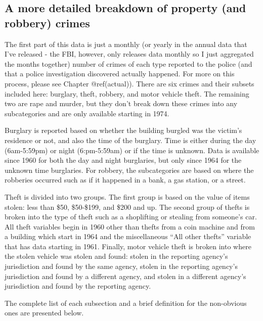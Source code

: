 \documentclass[
  12pt,
  openany]{book}
\begin{document}
\hypertarget{propertycount}{%
\subsection{A more detailed breakdown of property (and robbery) crimes}\label{propertycount}}

The first part of this data is just a monthly (or yearly in the annual data that I've released - the FBI, however, only releases data monthly so I just aggregated the months together) number of crimes of each type reported to the police (and that a police investigation discovered actually happened. For more on this process, please see Chapter @ref(actual)). There are six crimes and their subsets included here: burglary, theft, robbery, and motor vehicle theft. The remaining two are rape and murder, but they don't break down these crimes into any subcategories and are only available starting in 1974.

Burglary is reported based on whether the building burgled was the victim's residence or not, and also the time of the burglary. Time is either during the day (6am-5:59pm) or night (6:pm-5:59am) or if the time is unknown. Data is available since 1960 for both the day and night burglaries, but only since 1964 for the unknown time burglaries. For robbery, the subcategories are based on where the robberies occurred such as if it happened in a bank, a gas station, or a street.

Theft is divided into two groups. The first group is based on the value of items stolen: less than \$50, \$50-\$199, and \$200 and up. The second group of thefts is broken into the type of theft such as a shoplifting or stealing from someone's car. All theft variables begin in 1960 other than thefts from a coin machine and from a building which start in 1964 and the miscellaneous ``All other thefts'' variable that has data starting in 1961. Finally, motor vehicle theft is broken into where the stolen vehicle was stolen and found: stolen in the reporting agency's jurisdiction and found by the same agency, stolen in the reporting agency's jurisdiction and found by a different agency, and stolen in a different agency's jurisdiction and found by the reporting agency.

The complete list of each subsection and a brief definition for the non-obvious ones are presented below.
\end{document}
